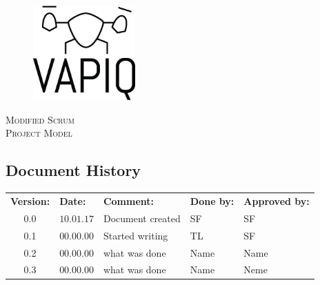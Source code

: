 \documentclass{article}
\author{Tomas Lyngroth \\ Aleksander Holthe \\ Vanja Katinka Halvorsen \\ Stian Fredriksen \\ Kent Kjeldaas \\ Katrine Sundal Haune}
\makeatletter
\let\vapiqteam\@author
\makeatother
\begin{document}
\begin{titlepage}
    \centering
    \pagecolor{gainsboro}
	\\[3.0 cm]
    \begin{figure}[h]
        \centering
        \includegraphics[width = 0.35\textwidth]{VAPIQ-PICTURES//Logo2_Tilted.png}
        \\[2.0 cm] 
    \end{figure}                              
    \textsc{\Huge Modified Scrum}  
    \\[1 cm]
    \textsc{\Large Project Model}   
    \\[3.0 cm]
	\large \vapiqteam      
\end{titlepage}
\pagecolor{white}


\begin{center}
\section*{\textbf{Document History}}
\begin{tabular}{cllll}
\rowcolor{cadetgrey}
\textbf{Version:}    &\textbf{Date:} 	 &\textbf{Comment:}    &\textbf{Done by:}   &\textbf{Approved by:}  \\

0.0       & $10.01.17$       & Document created  & SF    & SF          \\ \rowcolor{gainsboro}
0.1       & $00.00.00$       & Started writing  & TL    & SF          \\
0.2       & $00.00.00$       & what was done  & Name    & Name          \\ \rowcolor{gainsboro}
0.3       & $00.00.00$       & what was done  & Name    & Neme          \\
\end{tabular}                                                                   
\end{center}
\end{document}
